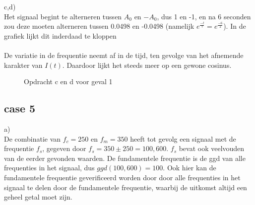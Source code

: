 \documentclass{article}
\begin{document}
c,d)\\
Het signaal begint te alterneren tussen $A_0$ en $-A_0$, dus 1 en -1, en na 6
seconden zou deze moeten alterneren tussen 0.0498 en -0.0498 (namelijk
$e^\frac{-t}{\tau} = e^\frac{-6}{2}$). In de grafiek lijkt dit inderdaad te
kloppen\\
\\
De variatie in de frequentie neemt af in de tijd, ten gevolge van het afnemende karakter van $I(t)$. Daardoor lijkt het steeds meer op een gewone cosinus.
\begin{figure}[h]
  \centering
  \caption{Opdracht c en d voor geval 1}
  \label{fig:case1b}
\end{figure}

\newpage 
\subsection{case 5}
a)\\
De combinatie van $f_c = 250$ en $f_m = 350$ heeft tot gevolg een signaal met de frequentie $f_s$, gegeven door $f_s = 350 \pm 250 = {100, 600}$. $f_s$ bevat ook veelvouden van de eerder gevonden waarden. De fundamentele frequentie is de ggd van alle frequenties in het signaal, dus $ggd(100, 600) = 100$. Ook hier kan de fundamentele frequentie geverificeerd worden door door alle frequenties in het signaal te delen door de fundamentele frequentie, waarbij de uitkomst altijd een geheel getal moet zijn.
\end{document}
